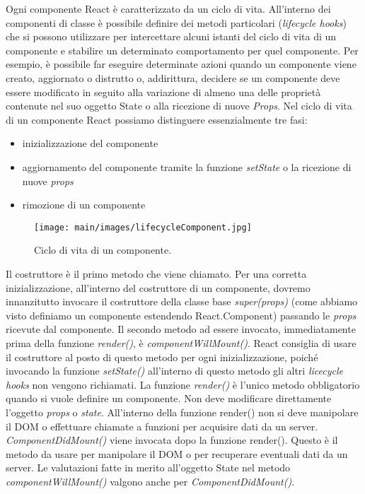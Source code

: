 Ogni componente React è caratterizzato da un ciclo di vita. All'interno dei componenti di classe è possibile definire dei metodi particolari (\textit{lifecycle hooks}) che si possono utilizzare per intercettare alcuni istanti del ciclo di vita di un componente e stabilire un determinato comportamento per quel componente. Per esempio, è possibile far eseguire determinate azioni quando un componente viene creato, aggiornato o distrutto o, addirittura, decidere se un componente deve essere modificato in seguito alla variazione di almeno una delle proprietà contenute nel suo oggetto State o alla ricezione di nuove \textit{Props}.
Nel ciclo di vita di un componente React possiamo distinguere essenzialmente tre fasi:
\begin{itemize}
    \item inizializzazione del componente
    \item aggiornamento del componente tramite la funzione \textit{setState} o la ricezione di nuove \textit{props}
    \item rimozione di un componente
\end{itemize}


\begin{figure}
\begin{center}
\texttt{[image: main/images/lifecycleComponent.jpg]}
\end{center}
\caption{Ciclo di vita di un componente.}
\label{fig:lifecycleComponent}
\end{figure}

Il costruttore è il primo metodo che viene chiamato. Per una corretta inizializzazione, all'interno del costruttore di un componente, dovremo innanzitutto invocare il costruttore della classe base \textit{super(props)} (come abbiamo visto definiamo un componente estendendo React.Component) passando le \textit{props} ricevute dal componente. 
Il secondo metodo ad essere invocato, immediatamente prima della funzione \textit{render()}, è \textit{componentWillMount()}. React consiglia di usare il costruttore al posto di questo metodo per ogni inizializzazione, poiché invocando la funzione \textit{setState()} all'interno di questo metodo gli altri \textit{licecycle hooks} non vengono richiamati.
La funzione \textit{render()} è l'unico metodo obbligatorio quando si vuole definire un componente. Non deve modificare direttamente l'oggetto \textit{props} o \textit{state}. All'interno della funzione render() non si deve manipolare il DOM o effettuare chiamate a funzioni per acquisire dati da un server. \textit{ComponentDidMount()} viene invocata dopo la funzione render(). Questo è il metodo da usare per manipolare il DOM o per recuperare eventuali dati da un server. Le valutazioni fatte in merito all'oggetto State nel metodo \textit{componentWillMount()} valgono anche per \textit{ComponentDidMount()}.

